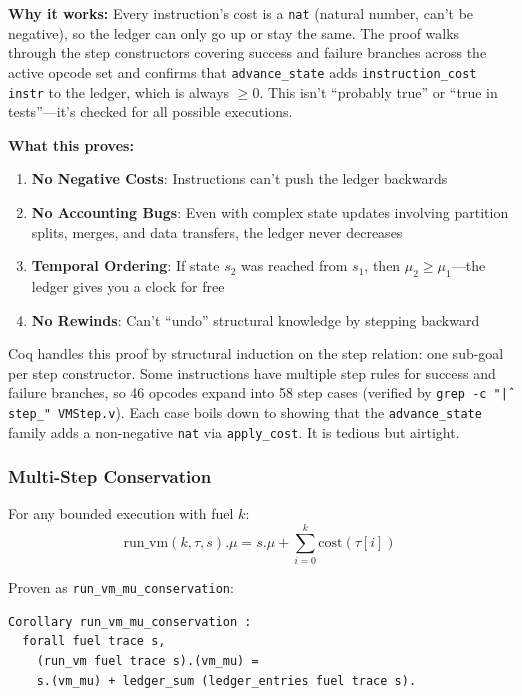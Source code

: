 \textbf{Why it works:} Every instruction's cost is a \texttt{nat} (natural number, can't be negative), so the ledger can only go up or stay the same. The proof walks through the step constructors covering success and failure branches across the active opcode set and confirms that \texttt{advance\_state} adds \texttt{instruction\_cost instr} to the ledger, which is always $\geq 0$. This isn't ``probably true'' or ``true in tests''---it's checked for all possible executions.

\textbf{What this proves:}
\begin{enumerate}
    \item \textbf{No Negative Costs}: Instructions can't push the ledger backwards
    \item \textbf{No Accounting Bugs}: Even with complex state updates involving partition splits, merges, and data transfers, the ledger never decreases
    \item \textbf{Temporal Ordering}: If state $s_2$ was reached from $s_1$, then $\mu_2 \geq \mu_1$---the ledger gives you a clock for free
    \item \textbf{No Rewinds}: Can't ``undo'' structural knowledge by stepping backward
\end{enumerate}

Coq handles this proof by structural induction on the step relation: one sub-goal per step constructor. Some instructions have multiple step rules for success and failure branches, so 46 opcodes expand into 58 step cases (verified by \texttt{grep -c "\^| step\_" VMStep.v}). Each case boils down to showing that the \texttt{advance\_state} family adds a non-negative \texttt{nat} via \texttt{apply\_cost}. It is tedious but airtight.

\subsubsection{Multi-Step Conservation}

\begin{theorem}
For any bounded execution with fuel $k$:
\[
\text{run\_vm}(k, \tau, s).\mu = s.\mu + \sum_{i=0}^{k} \text{cost}(\tau[i])
\]
\end{theorem}

Proven as \texttt{run\_vm\_mu\_conservation}:
\begin{lstlisting}
Corollary run_vm_mu_conservation :
  forall fuel trace s,
    (run_vm fuel trace s).(vm_mu) =
    s.(vm_mu) + ledger_sum (ledger_entries fuel trace s).
\end{lstlisting}

